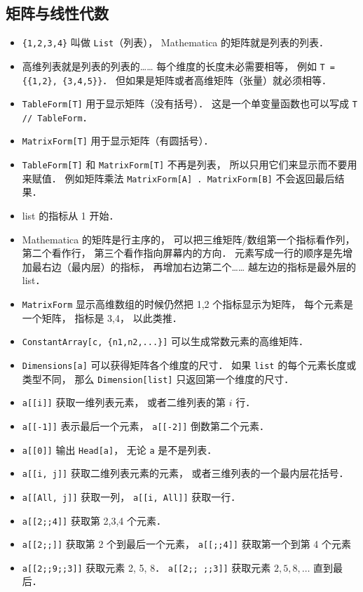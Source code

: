 \subsection{矩阵与线性代数}
\begin{itemize}
\item \verb|{1,2,3,4}| 叫做 \verb|List|（列表）， Mathematica 的矩阵就是列表的列表．
\item 高维列表就是列表的列表的…… 每个维度的长度未必需要相等， 例如 \verb|T = {{1,2}, {3,4,5}}|． 但如果是矩阵或者高维矩阵（张量）就必须相等．
\item \verb|TableForm[T]| 用于显示矩阵（没有括号）． 这是一个单变量函数也可以写成 \verb|T // TableForm|．
\item \verb|MatrixForm[T]| 用于显示矩阵（有圆括号）．
\item \verb|TableForm[T]| 和 \verb|MatrixForm[T]| 不再是列表， 所以只用它们来显示而不要用来赋值． 例如矩阵乘法 \verb|MatrixForm[A] . MatrixForm[B]| 不会返回最后结果．
\item list 的指标从 1 开始．
\item Mathematica 的矩阵是行主序的， 可以把三维矩阵/数组第一个指标看作列， 第二个看作行， 第三个看作指向屏幕内的方向． 元素写成一行的顺序是先增加最右边（最内层）的指标， 再增加右边第二个…… 越左边的指标是最外层的 list．
\item \verb|MatrixForm| 显示高维数组的时候仍然把 1,2 个指标显示为矩阵， 每个元素是一个矩阵， 指标是 3,4， 以此类推．
\item \verb|ConstantArray[c, {n1,n2,...}]| 可以生成常数元素的高维矩阵．
\item \verb|Dimensions[a]| 可以获得矩阵各个维度的尺寸． 如果 \verb|list| 的每个元素长度或类型不同， 那么 \verb|Dimension[list]| 只返回第一个维度的尺寸．
\item \verb|a[[i]]| 获取一维列表元素， 或者二维列表的第 $i$ 行．
\item \verb|a[[-1]]| 表示最后一个元素， \verb|a[[-2]]| 倒数第二个元素．
\item \verb|a[[0]]| 输出 \verb|Head[a]|， 无论 \verb|a| 是不是列表．
\item \verb|a[[i, j]]| 获取二维列表元素的元素， 或者三维列表的一个最内层花括号．
\item \verb|a[[All, j]]| 获取一列， \verb|a[[i, All]]| 获取一行．
\item \verb|a[[2;;4]]| 获取第 2,3,4 个元素．
\item \verb|a[[2;;]]| 获取第 2 个到最后一个元素， \verb|a[[;;4]]| 获取第一个到第 4 个元素
\item \verb|a[[2;;9;;3]]| 获取元素 2, 5, 8． \verb|a[[2;; ;;3]]| 获取元素 $2, 5, 8, \dots$ 直到最后．

\end{itemize}
